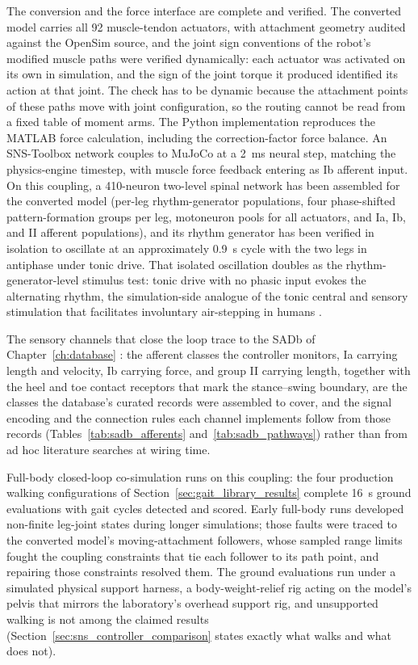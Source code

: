 The conversion and the force interface are complete and verified. The converted model carries all 92 muscle-tendon actuators, with attachment geometry audited against the OpenSim source, and the joint sign conventions of the robot's modified muscle paths were verified dynamically: each actuator was activated on its own in simulation, and the sign of the joint torque it produced identified its action at that joint. The check has to be dynamic because the attachment points of these paths move with joint configuration, so the routing cannot be read from a fixed table of moment arms. The Python implementation reproduces the MATLAB force calculation, including the correction-factor force balance. An SNS-Toolbox network couples to MuJoCo at a \qty{2}{\milli\second} neural step, matching the physics-engine timestep, with muscle force feedback entering as Ib afferent input. On this coupling, a 410-neuron two-level spinal network has been assembled for the converted model (per-leg rhythm-generator populations, four phase-shifted pattern-formation groups per leg, motoneuron pools for all actuators, and Ia, Ib, and II afferent populations), and its rhythm generator has been verified in isolation to oscillate at an approximately \qty{0.9}{\second} cycle with the two legs in antiphase under tonic drive. That isolated oscillation doubles as the rhythm-generator-level stimulus test: tonic drive with no phasic input evokes the alternating rhythm, the simulation-side analogue of the tonic central and sensory stimulation that facilitates involuntary air-stepping in humans \citep{selionov_tonic_2009}.

The sensory channels that close the loop trace to the SADb of Chapter~\ref{ch:database} \citep{bolen_sensory_2023}: the afferent classes the controller monitors, Ia carrying length and velocity, Ib carrying force, and group II carrying length, together with the heel and toe contact receptors that mark the stance--swing boundary, are the classes the database's curated records were assembled to cover, and the signal encoding and the connection rules each channel implements follow from those records (Tables~\ref{tab:sadb_afferents} and~\ref{tab:sadb_pathways}) rather than from ad hoc literature searches at wiring time.

Full-body closed-loop co-simulation runs on this coupling: the four production walking configurations of Section~\ref{sec:gait_library_results} complete \qty{16}{\second} ground evaluations with gait cycles detected and scored. Early full-body runs developed non-finite leg-joint states during longer simulations; those faults were traced to the converted model's moving-attachment followers, whose sampled range limits fought the coupling constraints that tie each follower to its path point, and repairing those constraints resolved them. The ground evaluations run under a simulated physical support harness, a body-weight-relief rig acting on the model's pelvis that mirrors the laboratory's overhead support rig, and unsupported walking is not among the claimed results (Section~\ref{sec:sns_controller_comparison} states exactly what walks and what does not).

